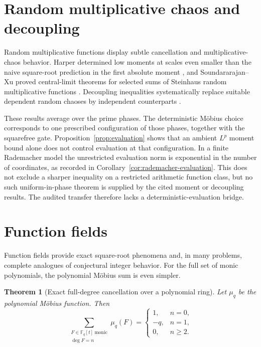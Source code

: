 \documentclass[11pt]{amsart}
\numberwithin{equation}{section}
\theoremstyle{plain}
\newtheorem{theorem}{Theorem}[section]
\theoremstyle{definition}
\theoremstyle{remark}
\newcommand{\F}{\mathbb F}
\begin{document}
\section{Random multiplicative chaos and decoupling}\label{sec:chaos}

Random multiplicative functions display subtle cancellation and
multiplicative-chaos behavior.  Harper determined low moments at scales even
smaller than the naive square-root prediction in the first absolute moment
\cite{Harper2020}, and Soundararajan--Xu proved central-limit theorems for
selected sums of Steinhaus random multiplicative functions
\cite{SoundXu2023}.  Decoupling inequalities systematically replace suitable
dependent random chaoses by independent counterparts \cite{deLaPenaGine1999}.

These results average over the prime phases.  The deterministic M\"obius
choice corresponds to one prescribed configuration of those phases, together
with the squarefree gate.  Proposition~\ref{prop:evaluation} shows that an
ambient \(L^p\) moment bound alone does not control evaluation at that
configuration.  In a finite Rademacher model the unrestricted evaluation norm
is exponential in the number of coordinates, as recorded in
Corollary~\ref{cor:rademacher-evaluation}.  This does not exclude a sharper
inequality on a restricted arithmetic function class, but no such
uniform-in-phase theorem is supplied by the cited moment or decoupling
results.  The audited transfer therefore lacks a deterministic-evaluation
bridge.

\section{Function fields}\label{sec:function-fields}

Function fields provide exact square-root phenomena and, in many problems,
complete analogues of conjectural integer behavior.  For the full set of monic
polynomials, the polynomial M\"obius sum is even simpler.

\begin{theorem}[Exact full-degree cancellation over a polynomial ring]
\label{thm:function-field}
Let \(\mu_q\) be the polynomial M\"obius function.  Then
\begin{equation}\label{eq:function-field-sum}
  \sum_{\substack{F\in\F_q[t]\ \mathrm{monic}\\ \deg F=n}}\mu_q(F)
  =\begin{cases}
    1,&n=0,\\
    -q,&n=1,\\
    0,&n\geq2.
  \end{cases}
\end{equation}
\end{theorem}
\end{document}
